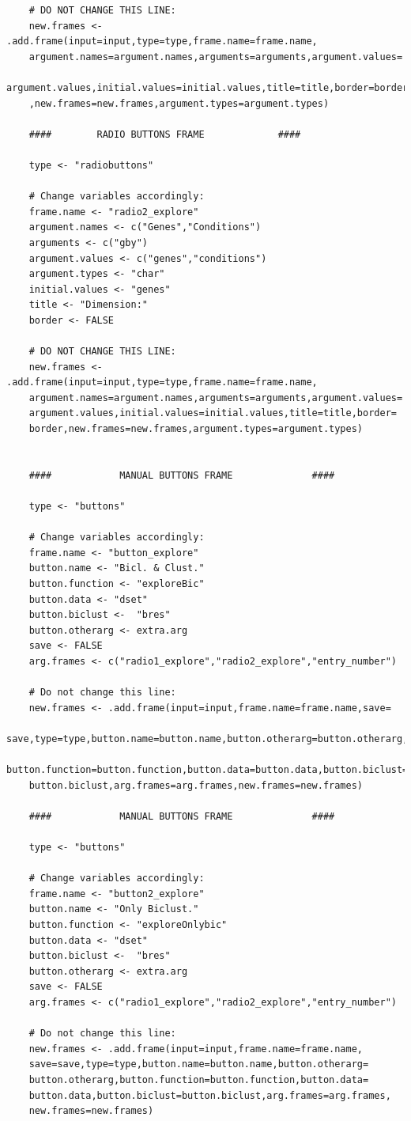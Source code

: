 \documentclass[a4paper]{article}\usepackage[]{graphicx}\usepackage[]{color}
\begin{document}
\begin{verbatim}
	# DO NOT CHANGE THIS LINE:
	new.frames <- .add.frame(input=input,type=type,frame.name=frame.name,
    argument.names=argument.names,arguments=arguments,argument.values=
    argument.values,initial.values=initial.values,title=title,border=border
    ,new.frames=new.frames,argument.types=argument.types)	
	
	####		RADIO BUTTONS FRAME  			####
	
	type <- "radiobuttons"
	
	# Change variables accordingly:
	frame.name <- "radio2_explore"
	argument.names <- c("Genes","Conditions")  
	arguments <- c("gby")		
	argument.values <- c("genes","conditions") 
	argument.types <- "char"
	initial.values <- "genes" 
	title <- "Dimension:"
	border <- FALSE
	
	# DO NOT CHANGE THIS LINE:
	new.frames <- .add.frame(input=input,type=type,frame.name=frame.name,
    argument.names=argument.names,arguments=arguments,argument.values=
    argument.values,initial.values=initial.values,title=title,border=
    border,new.frames=new.frames,argument.types=argument.types)	
	
	
	####	    	MANUAL BUTTONS FRAME 			  ####
	
	type <- "buttons"
	
	# Change variables accordingly:
	frame.name <- "button_explore"  
	button.name <- "Bicl. & Clust."  
	button.function <- "exploreBic" 
	button.data <- "dset" 
	button.biclust <-  "bres" 
	button.otherarg <- extra.arg
	save <- FALSE
	arg.frames <- c("radio1_explore","radio2_explore","entry_number") 
	
	# Do not change this line:
	new.frames <- .add.frame(input=input,frame.name=frame.name,save=
    save,type=type,button.name=button.name,button.otherarg=button.otherarg,
    button.function=button.function,button.data=button.data,button.biclust=
    button.biclust,arg.frames=arg.frames,new.frames=new.frames)
	
	####	    	MANUAL BUTTONS FRAME 			  ####
	
	type <- "buttons"
	
	# Change variables accordingly:
	frame.name <- "button2_explore"  
	button.name <- "Only Biclust."  
	button.function <- "exploreOnlybic" 
	button.data <- "dset" 
	button.biclust <-  "bres" 
	button.otherarg <- extra.arg
	save <- FALSE
	arg.frames <- c("radio1_explore","radio2_explore","entry_number") 
	
	# Do not change this line:
	new.frames <- .add.frame(input=input,frame.name=frame.name,
    save=save,type=type,button.name=button.name,button.otherarg=
    button.otherarg,button.function=button.function,button.data=
    button.data,button.biclust=button.biclust,arg.frames=arg.frames,
    new.frames=new.frames)
	

\end{verbatim}
\end{document}
